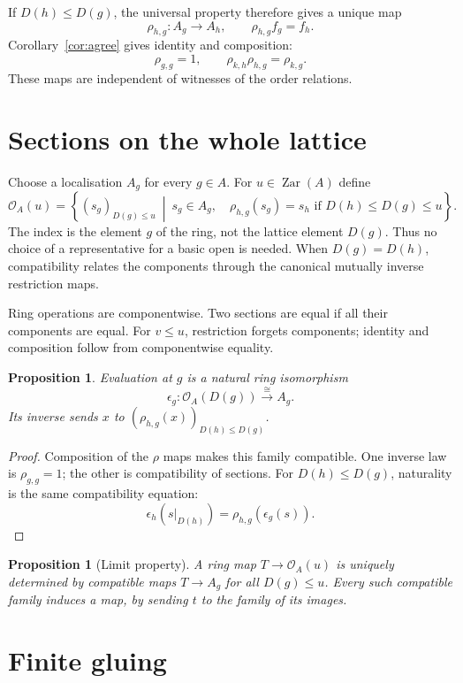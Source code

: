 \documentclass[11pt]{amsart}
\newtheorem{proposition}[theorem]{Proposition}
\theoremstyle{definition}
\theoremstyle{remark}
\newcommand{\Zar}{\operatorname{Zar}}
\newcommand{\OO}{\mathcal O}
\newcommand{\restr}[2]{#1|_{#2}}
\begin{document}
If $D(h)\leq D(g)$, the universal property therefore gives a unique map
\[
 \rho_{h,g}:A_g\longrightarrow A_h,\qquad \rho_{h,g}f_g=f_h.
\]
Corollary~\ref{cor:agree} gives identity and composition:
\[
 \rho_{g,g}=1,\qquad \rho_{k,h}\rho_{h,g}=\rho_{k,g}.
\]
These maps are independent of witnesses of the order relations.

\section{Sections on the whole lattice}

Choose a localisation $A_g$ for every $g\in A$. For $u\in\Zar(A)$ define
\[
 \OO_A(u)=\left\{(s_g)_{D(g)\leq u}\ \middle|\
 s_g\in A_g,\quad \rho_{h,g}(s_g)=s_h\text{ if }D(h)\leq D(g)\leq u
 \right\}.
\]
The index is the element $g$ of the ring, not the lattice element $D(g)$.
Thus no choice of a representative for a basic open is needed.
When $D(g)=D(h)$, compatibility relates the components through the
canonical mutually inverse restriction maps.

Ring operations are componentwise. Two sections are equal if all their
components are equal. For $v\leq u$, restriction forgets components;
identity and composition follow from componentwise equality.

\begin{proposition}\label{prop:basic}
Evaluation at $g$ is a natural ring isomorphism
\[
 \epsilon_g:\OO_A(D(g))\xrightarrow{\ \cong\ }A_g.
\]
Its inverse sends $x$ to $(\rho_{h,g}(x))_{D(h)\leq D(g)}$.
\end{proposition}
\begin{proof}
Composition of the $\rho$ maps makes this family compatible. One inverse
law is $\rho_{g,g}=1$; the other is compatibility of sections. For
$D(h)\leq D(g)$, naturality is the same compatibility equation:
\[
 \epsilon_h(\restr{s}{D(h)})=\rho_{h,g}(\epsilon_g(s)).
\]
\end{proof}

\begin{proposition}[Limit property]
A ring map $T\to\OO_A(u)$ is uniquely determined by compatible maps
$T\to A_g$ for all $D(g)\leq u$. Every such compatible family induces a
map, by sending $t$ to the family of its images.
\end{proposition}

\section{Finite gluing}
\end{document}
